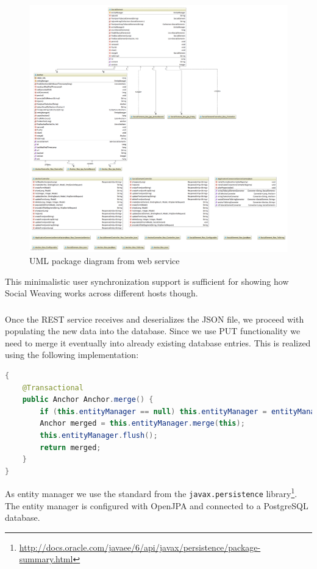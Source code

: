 \begin{figure}\centering
		\includegraphics[width=13cm]{images/sowe-ws-uml-package.png}
		\caption{UML package diagram from web service}
		\label{sowe-ws-uml-package}
\end{figure} 

This minimalistic user synchronization support is sufficient for showing how Social Weaving works across different hosts though.

\subsubsection[Persistence]{\reqWSiii}
Once the REST service receives and deserializes the JSON file, we proceed with populating the new data into the database. Since we use PUT functionality we need to merge it eventually into already existing database entries. This is realized using the following implementation:

\begin{lstlisting}[language=Java]
{
    @Transactional
    public Anchor Anchor.merge() {
        if (this.entityManager == null) this.entityManager = entityManager();
        Anchor merged = this.entityManager.merge(this);
        this.entityManager.flush();
        return merged;
    }
}
\end{lstlisting}

As entity manager we use the standard from the \verb^javax.persistence^ library\footnote{\url{http://docs.oracle.com/javaee/6/api/javax/persistence/package-summary.html}}. The entity manager is configured with OpenJPA and connected to a PostgreSQL database. 

